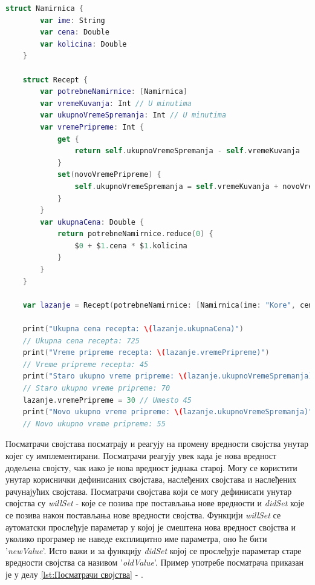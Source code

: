 \documentclass[12pt,oneside]{memoir}
\begin{document}
\begin{lstlisting}[caption=\textit{{Рачунајућа својства}}, label={lst:Рачунајућа својства}, language=Swift, frame=single]
    struct Namirnica {
        var ime: String
        var cena: Double
        var kolicina: Double
    }
    
    struct Recept {
        var potrebneNamirnice: [Namirnica]
        var vremeKuvanja: Int // U minutima
        var ukupnoVremeSpremanja: Int // U minutima
        var vremePripreme: Int {
            get {
                return self.ukupnoVremeSpremanja - self.vremeKuvanja
            }
            set(novoVremePripreme) {
                self.ukupnoVremeSpremanja = self.vremeKuvanja + novoVremePripreme
            }
        }
        var ukupnaCena: Double {
            return potrebneNamirnice.reduce(0) {
                $0 + $1.cena * $1.kolicina
            }
        }
    }
    
    var lazanje = Recept(potrebneNamirnice: [Namirnica(ime: "Kore", cena: 250, kolicina: 1), Namirnica(ime: "Mleveno meso", cena: 500, kolicina: 0.75), Namirnica(ime: "Sos", cena: 100, kolicina: 1)], vremeKuvanja: 25, ukupnoVremeSpremanja: 70)
    
    print("Ukupna cena recepta: \(lazanje.ukupnaCena)")
    // Ukupna cena recepta: 725
    print("Vreme pripreme recepta: \(lazanje.vremePripreme)")
    // Vreme pripreme recepta: 45
    print("Staro ukupno vreme pripreme: \(lazanje.ukupnoVremeSpremanja)")
    // Staro ukupno vreme pripreme: 70
    lazanje.vremePripreme = 30 // Umesto 45
    print("Novo ukupno vreme pripreme: \(lazanje.ukupnoVremeSpremanja)")
    // Novo ukupno vreme pripreme: 55
\end{lstlisting}

\indent Посматрачи својстава посматрају и реагују на промену вредности својства унутар којег су имплементирани. Посматрачи реагују увек када је нова вредност додељена својсту, чак иако је нова вредност једнака старој. Могу се користити унутар кориснички дефинисаних својстава, наслеђених својстава и наслеђених рачунајућих својстава. Посматрачи својстава који се могу дефинисати унутар својства су \textit{willSet} - које се позива пре постављања нове вредности и \textit{didSet} које се позива након постављања нове вредности својства. Функцији \textit{willSet} се аутоматски прослеђује параметар у којој је смештена нова вредност својства и уколико програмер не наведе експлицитно име параметра, оно ће бити '\textit{newValue}'. Исто важи и за функцију \textit{didSet} којој се прослеђује параметар старе вредности својства са називом '\textit{oldValue}'. Пример употребе посматрача приказан је у делу \ref{lst:Посматрачи својства} - .
\end{document}
